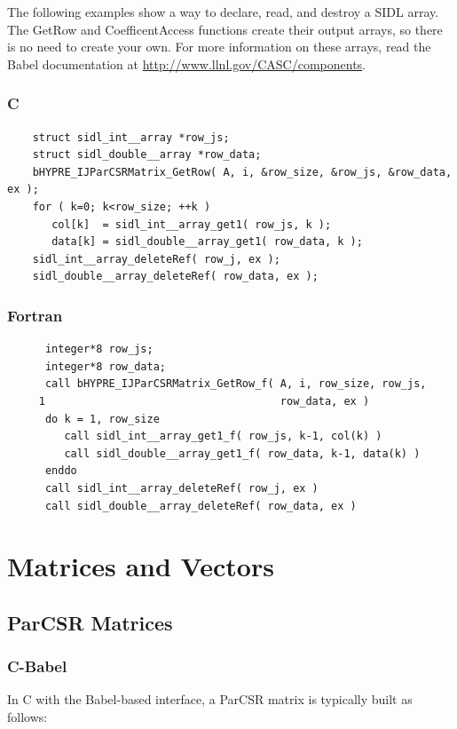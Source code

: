 The following examples show a way to declare, read, and destroy a SIDL
array.  The GetRow and CoefficentAccess functions create their output
arrays, so there is no need to create your own.  For more information
on these arrays, read the Babel documentation at
\url{http://www.llnl.gov/CASC/components}.


\subsubsection{C}
\begin{verbatim}
    struct sidl_int__array *row_js;
    struct sidl_double__array *row_data;
    bHYPRE_IJParCSRMatrix_GetRow( A, i, &row_size, &row_js, &row_data, ex );
    for ( k=0; k<row_size; ++k )
       col[k]  = sidl_int__array_get1( row_js, k );
       data[k] = sidl_double__array_get1( row_data, k );
    sidl_int__array_deleteRef( row_j, ex );
    sidl_double__array_deleteRef( row_data, ex );
\end{verbatim}
\subsubsection{Fortran}
\begin{verbatim}
      integer*8 row_js;
      integer*8 row_data;
      call bHYPRE_IJParCSRMatrix_GetRow_f( A, i, row_size, row_js,
     1                                     row_data, ex )
      do k = 1, row_size
         call sidl_int__array_get1_f( row_js, k-1, col(k) )
         call sidl_double__array_get1_f( row_data, k-1, data(k) )
      enddo
      call sidl_int__array_deleteRef( row_j, ex )
      call sidl_double__array_deleteRef( row_data, ex )
\end{verbatim}


\section{Matrices and Vectors}
\label{sec-Matrices-Vectors}

\subsection{ParCSR Matrices}
\label{subsec-ParCSRMatrices}

\subsubsection{C-Babel}
In C with the Babel-based interface, a ParCSR matrix is typically built as follows:

